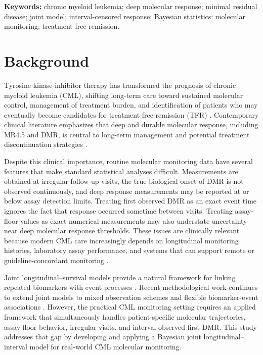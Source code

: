 \documentclass[11pt]{article}
\begin{document}
\noindent\textbf{Keywords:} chronic myeloid leukemia; deep molecular response; minimal residual disease; joint model; interval-censored response; Bayesian statistics; molecular monitoring; treatment-free remission.

\section{Background}

Tyrosine kinase inhibitor therapy has transformed the prognosis of chronic myeloid leukemia (CML), shifting long-term care toward sustained molecular control, management of treatment burden, and identification of patients who may eventually become candidates for treatment-free remission (TFR) \cite{Hochhaus2020ELN,Jabbour2025JAMAReview,Haddad2026Algorithms,Senapati2023CMLManagement}. Contemporary clinical literature emphasizes that deep and durable molecular response, including MR4.5 and DMR, is central to long-term management and potential treatment discontinuation strategies \cite{Hughes2014EarlyMolecularResponse,Rasekh2026TFRPredictor,Ono2026MR45,Takahashi2026JSKI}.

Despite this clinical importance, routine molecular monitoring data have several features that make standard statistical analyses difficult. Measurements are obtained at irregular follow-up visits, the true biological onset of DMR is not observed continuously, and deep response measurements may be reported at or below assay detection limits. Treating first observed DMR as an exact event time ignores the fact that response occurred sometime between visits. Treating assay-floor values as exact numerical measurements may also understate uncertainty near deep molecular response thresholds. These issues are clinically relevant because modern CML care increasingly depends on longitudinal monitoring histories, laboratory assay performance, and systems that can support remote or guideline-concordant monitoring \cite{Kim2026BCRABLqPCR,Verweij2026RemoteMonitoring}.

Joint longitudinal--survival models provide a natural framework for linking repeated biomarkers with event processes \cite{Wulfsohn1997JointModel,Rizopoulos2016JMbayes}. Recent methodological work continues to extend joint models to mixed observation schemes and flexible biomarker-event associations \cite{Lovblom2026MixedObservationJointModel,Niu2026QuantileJointModel}. However, the practical CML monitoring setting requires an applied framework that simultaneously handles patient-specific molecular trajectories, assay-floor behavior, irregular visits, and interval-observed first DMR. This study addresses that gap by developing and applying a Bayesian joint longitudinal--interval model for real-world CML molecular monitoring.
\end{document}
